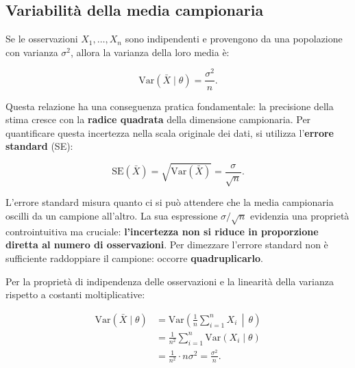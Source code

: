 \documentclass[
  italian,
  letterpaper,
  a4paper,
  11pt,
  open=any]{scrbook}
\theoremstyle{plain}
\theoremstyle{definition}
\theoremstyle{definition}
\theoremstyle{remark}
\begin{document}
\subsection{Variabilità della media
campionaria}\label{variabilituxe0-della-media-campionaria}

Se le osservazioni \(X_1, \dots, X_n\) sono indipendenti e provengono da
una popolazione con varianza \(\sigma^2\), allora la varianza della loro
media è:

\[
\text{Var}(\bar{X} \mid \theta) = \frac{\sigma^2}{n}.
\]

Questa relazione ha una conseguenza pratica fondamentale: la precisione
della stima cresce con la \textbf{radice quadrata} della dimensione
campionaria. Per quantificare questa incertezza nella scala originale
dei dati, si utilizza l'\textbf{errore standard} (SE):

\[
\text{SE}(\bar{X}) = \sqrt{\text{Var}(\bar{X})} = \frac{\sigma}{\sqrt{n}}.
\]

L'errore standard misura quanto ci si può attendere che la media
campionaria oscilli da un campione all'altro. La sua espressione
\(\sigma/\sqrt{n}\) evidenzia una proprietà controintuitiva ma cruciale:
\textbf{l'incertezza non si riduce in proporzione diretta al numero di
osservazioni}. Per dimezzare l'errore standard non è sufficiente
raddoppiare il campione: occorre \textbf{quadruplicarlo}.

\begin{tcolorbox}[enhanced jigsaw, arc=.35mm, bottomrule=.15mm, bottomtitle=1mm, breakable, colback=white, colbacktitle=quarto-callout-note-color!10!white, colframe=quarto-callout-note-color-frame, coltitle=black, left=2mm, leftrule=.75mm, opacityback=0, opacitybacktitle=0.6, rightrule=.15mm, title=\textcolor{quarto-callout-note-color}{\faInfo}\hspace{0.5em}{Dimostrazione}, titlerule=0mm, toprule=.15mm, toptitle=1mm]

Per la proprietà di indipendenza delle osservazioni e la linearità della
varianza rispetto a costanti moltiplicative:

\[
\begin{aligned}
\text{Var}(\bar{X} \mid \theta)
&= \text{Var}\left(\frac{1}{n}\sum_{i=1}^{n}X_i \,\middle|\, \theta\right) \\
&= \frac{1}{n^2}\sum_{i=1}^{n}\text{Var}(X_i \mid \theta) \\
&= \frac{1}{n^2} \cdot n\sigma^2 = \frac{\sigma^2}{n}.
\end{aligned}
\]

\end{tcolorbox}
\end{document}
